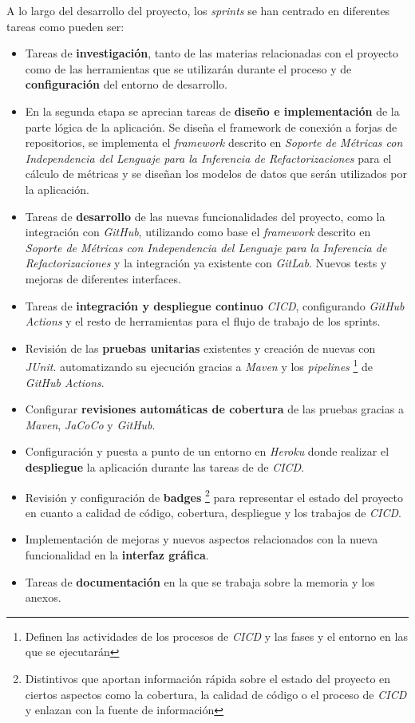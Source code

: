 A lo largo del desarrollo del proyecto, los \textit{sprints} se han centrado en diferentes tareas como pueden ser:
\begin{itemize}
	\item  Tareas de \textbf{investigación}, tanto de las materias relacionadas con el proyecto como de las herramientas que se utilizarán durante el proceso y de \textbf{configuración} del entorno de desarrollo.
	\item En la segunda etapa se aprecian tareas de \textbf{diseño e implementación} de la parte lógica de la aplicación. Se diseña el framework de conexión a forjas de repositorios, se implementa el \textit{framework} descrito en \textit{Soporte de Métricas con Independencia del Lenguaje para la Inferencia de Refactorizaciones}  \cite{marticorena_sanchez_soporte_2005} para el cálculo de métricas y se diseñan los modelos de datos que serán utilizados por la aplicación.
	\item Tareas de \textbf{desarrollo} de las nuevas funcionalidades del proyecto, como la integración con \textit{GitHub}, utilizando como base el \textit{framework} descrito en \textit{Soporte de Métricas con Independencia del Lenguaje para la Inferencia de Refactorizaciones}  \cite{marticorena_sanchez_soporte_2005} y la integración ya existente con \textit{GitLab}. Nuevos tests y mejoras de diferentes interfaces.
	\item Tareas de \textbf{integración y despliegue continuo} \textit{CICD}, configurando \textit{GitHub Actions} y el resto de herramientas para el flujo de trabajo de los sprints.
	\item Revisión de las \textbf{pruebas unitarias} existentes y creación de nuevas con \textit{JUnit}. automatizando su ejecución gracias a \textit{Maven} y los \textit{pipelines} \footnote{Definen las actividades de los procesos de \textit{CICD} y las fases y el entorno en las que se ejecutarán} de \textit{GitHub Actions}.
	\item Configurar \textbf{revisiones automáticas de cobertura} de las pruebas gracias a \textit{Maven}, \textit{JaCoCo} y \textit{GitHub}.
	\item Configuración y puesta a punto de un entorno en \textit{Heroku} donde realizar el \textbf{despliegue} la aplicación durante las tareas de de \textit{CICD}.
	\item Revisión y configuración de \textbf{badges} \footnote{Distintivos que aportan información rápida sobre el estado del proyecto en ciertos aspectos como la cobertura, la calidad de código o el proceso de \textit{CICD} y enlazan con la fuente de información} para representar el estado del proyecto en cuanto a calidad de código, cobertura, despliegue y los trabajos de \textit{CICD}.
	\item Implementación de mejoras y nuevos aspectos relacionados con la nueva funcionalidad en la \textbf{interfaz gráfica}.
	\item Tareas de \textbf{documentación} en la que se trabaja sobre la memoria y los anexos.
\end{itemize}

